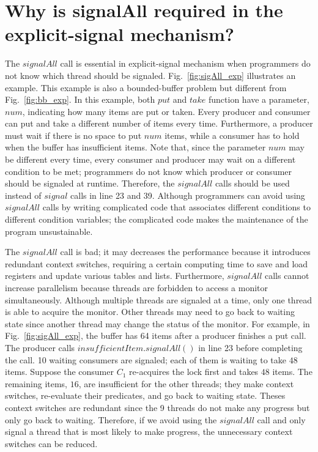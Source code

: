 \documentclass[preprint]{sigplanconf}
\begin{document}

\section{Why is signalAll required in the explicit-signal mechanism?} 
\label{sec:sigAll}
The $signalAll$ call is essential in explicit-signal mechanism when programmers
do not know which thread should be signaled. Fig.~\ref{fig:sigAll_exp}
illustrates an example. This example is also a bounded-buffer problem but 
different from Fig.~\ref{fig:bb_exp}. In this example, both $put$ and $take$
function have a parameter, $num$, indicating how many items are put or taken. 
Every producer and consumer can put and take a different number of items
every time.  Furthermore, a producer must wait if there is no space to put
$num$ items, while a consumer has to hold when the buffer has insufficient items.
Note that, since the parameter $num$ may be different every time, every 
consumer and producer may wait on a different condition to be met; programmers 
do not know which producer or consumer should be signaled at runtime. 
Therefore, the $signalAll$ calls should be used instead of $signal$ calls in
line 23 and 39.
Although programmers can avoid using $signalAll$ calls by writing
complicated code that associates different conditions to different condition 
variables; the complicated code makes the maintenance of the program
unsustainable. 

The $signalAll$ call is bad; it may decreases the performance because 
it introduces redundant context switches, requiring a certain 
computing time to save and load registers and update various tables and lists.
Furthermore, $signalAll$ calls cannot increase parallelism because threads
are forbidden to access a monitor simultaneously. Although multiple threads are
signaled at a time, only one thread is able to acquire the monitor. Other 
threads may need to go back to waiting state since another thread may change 
the status of the monitor. For example, in Fig.~\ref{fig:sigAll_exp}, the 
buffer has 64 items after a producer finishes a put call. The producer calls 
$insufficientItem.signalAll()$ in line 23 before completing the call. 10  
waiting consumers are signaled; each of them is waiting to take $48$ items.
Suppose the consumer $C_1$ re-acquires the lock first and takes $48$ items. The
remaining items, $16$, are insufficient for the other threads; they
make context switches, re-evaluate their predicates, and go back to waiting 
state. Theses context switches are redundant since the 9 threads do not 
make any progress but only go back to waiting. 
Therefore, if we avoid using the $signalAll$ call and only signal a thread that 
is most likely to make progress, the unnecessary context switches can be
reduced.
\end{document}
